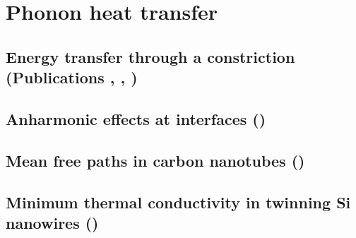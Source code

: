 

\section{Phonon heat transfer}


\subsection{Energy transfer through a constriction (Publications , , )} 

\subsection{Anharmonic effects at interfaces ()}

\subsection{Mean free paths in carbon nanotubes ()}

\subsection{Minimum thermal conductivity in twinning Si nanowires ()}
